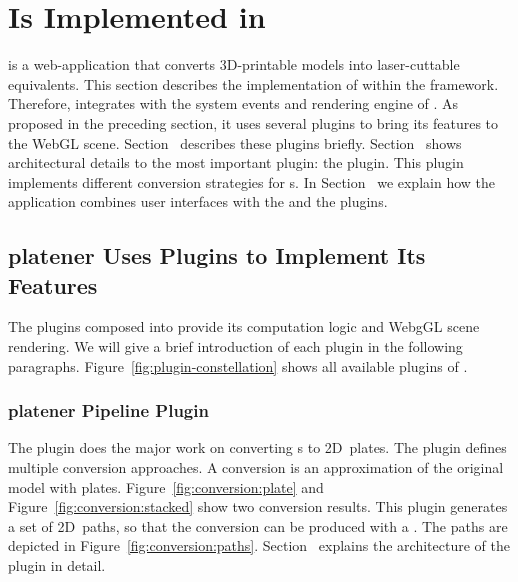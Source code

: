 \documentclass[../../ClassicThesis.tex]{subfiles}
\begin{document}
\section{{\platener} Is Implemented in {\convertify}}
\label{sec:application-platener}


{\platener} is a web-application that converts 3D-printable
models into laser-cuttable equivalents. This section
describes the implementation of {\platener} within the
{\convertify} framework. Therefore, {\platener} integrates
with the system events and rendering engine of
{\convertify}. As proposed in the preceding section, it uses
several plugins to bring its features to the WebGL
scene. Section~ describes
these plugins briefly.
Section~ shows
architectural details to the most important plugin:
the  plugin. This plugin
implements different conversion strategies for
{\threedmodel}s. In Section~
we explain how the application combines user interfaces with
the  and the plugins.

\subsection{platener Uses Plugins to Implement Its Features}
\label{sec:platener-uses-plugins}

The plugins composed into {\platener} provide its computation
logic and WebgGL scene rendering. We will give a brief introduction of
each plugin in the following paragraphs.
Figure~\ref{fig:plugin-constellation} shows all available plugins of
{\platener}.

\subsubsection{platener Pipeline Plugin}

The  plugin does the major work on
converting {\threedmodel}s to 2D~plates. The plugin defines
multiple conversion approaches. A conversion is an
approximation of the original model with plates.
Figure~\ref{fig:conversion:plate} and
Figure~\ref{fig:conversion:stacked} show two conversion
results. This plugin generates a set of 2D~paths, so that
the conversion can be produced with a {\lasercutter}. The
paths are depicted in Figure~\ref{fig:conversion:paths}.
Section~ explains the
architecture of the  plugin in
detail.
\end{document}
